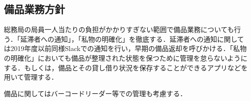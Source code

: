 \subsection*{備品業務方針}


総務局の局員一人当たりの負担がかかりすぎない範囲で備品業務についても行う．「延滞者への通知」，「私物の明確化」を徹底する．延滞者への通知に関しては2019年度以前同様Slackでの通知を行い，早期の備品返却を呼びかける．「私物の明確化」においても備品が整理された状態を保つために管理を怠らないようにする．もしくは，備品とその貸し借り状況を保存することができるアプリなどを用いて管理する．

備品に関してはバーコードリーダー等での管理も考慮する．
